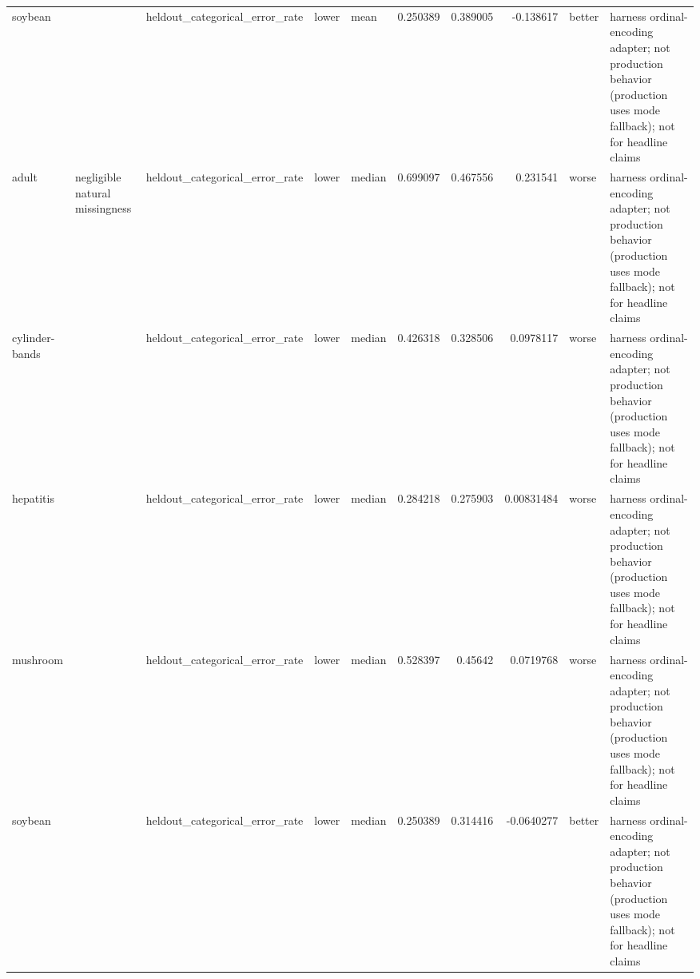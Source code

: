 \begin{table}[ht]
{\begin{tabular}{lllllrrrll}
 soybean        &                                                                       & heldout\_categorical\_error\_rate & lower              & mean             &                   0.250389 &               0.389005 &                    -0.138617    & better               & harness ordinal-encoding adapter; not production behavior (production uses mode fallback); not for headline claims \\
 adult          & negligible natural missingness                                        & heldout\_categorical\_error\_rate & lower              & median           &                   0.699097 &               0.467556 &                     0.231541    & worse                & harness ordinal-encoding adapter; not production behavior (production uses mode fallback); not for headline claims \\
 cylinder-bands &                                                                       & heldout\_categorical\_error\_rate & lower              & median           &                   0.426318 &               0.328506 &                     0.0978117   & worse                & harness ordinal-encoding adapter; not production behavior (production uses mode fallback); not for headline claims \\
 hepatitis      &                                                                       & heldout\_categorical\_error\_rate & lower              & median           &                   0.284218 &               0.275903 &                     0.00831484  & worse                & harness ordinal-encoding adapter; not production behavior (production uses mode fallback); not for headline claims \\
 mushroom       &                                                                       & heldout\_categorical\_error\_rate & lower              & median           &                   0.528397 &               0.45642  &                     0.0719768   & worse                & harness ordinal-encoding adapter; not production behavior (production uses mode fallback); not for headline claims \\
 soybean        &                                                                       & heldout\_categorical\_error\_rate & lower              & median           &                   0.250389 &               0.314416 &                    -0.0640277   & better               & harness ordinal-encoding adapter; not production behavior (production uses mode fallback); not for headline claims \\

\end{tabular}}
\end{table}
